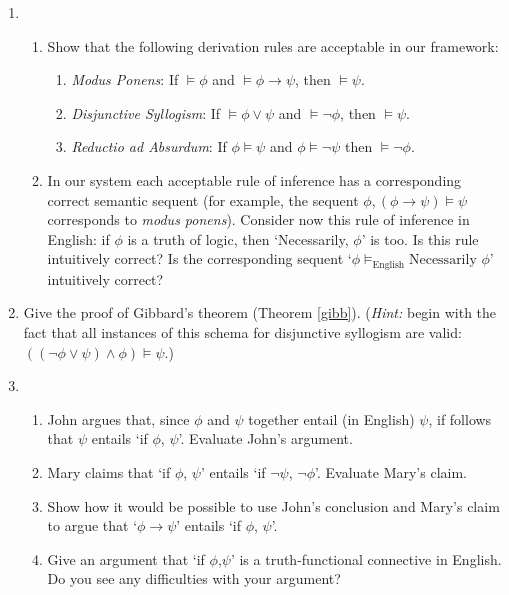 {\begin{enumerate}
	\item 	\begin{enumerate} \item Show that the following derivation rules are acceptable in our framework: \begin{enumerate}
		\item \emph{Modus Ponens}: If $\vDash \phi$ and $\vDash \phi \to \psi$, then $\vDash \psi$.
				\item \emph{Disjunctive Syllogism}: If $\vDash \phi \vee \psi$ and $\vDash \neg \phi$, then $\vDash \psi$.
				\item \emph{Reductio ad Absurdum}: If $\phi \vDash \psi$ and $\phi \vDash \neg \psi$ then $\vDash \neg \phi$. \end{enumerate}
	\item
		 In our system each acceptable rule of inference has a corresponding correct semantic sequent (for example, the sequent $\phi, (\phi \to \psi) \vDash \psi$ corresponds to  \emph{modus ponens}). Consider now this rule of inference in English: if $\phi$ is a truth of logic, then `Necessarily, $\phi$' is too.  Is this rule intuitively correct? Is the corresponding sequent `$\phi \vDash_{\text{English}} \text{Necessarily } \phi$' intuitively correct?
		\end{enumerate}
\item Give the proof of Gibbard's theorem (Theorem \ref{gibb}). (\emph{Hint:} begin with the fact that all instances of this schema for disjunctive syllogism are valid: $((¬\phi \vee \psi)\wedge\phi)\vDash\psi$.)
		\item \begin {enumerate} \item John argues that, since $\phi$ and $\psi$ together entail (in English)
		$\psi$, if follows that $\psi$ entails `if $\phi$, $\psi$'. Evaluate John's argument.

		\item Mary claims that `if $\phi$, $\psi$' entails `if $\neg \psi$, $\neg
		\phi$'. Evaluate Mary's claim.
		\item Show how it would be possible to use John's conclusion and
		Mary's claim to argue that `$\phi \to \psi$' entails `if $\phi$,
		$\psi$'.
		\item Give an argument that `if $\phi$,$\psi$' is a truth-functional connective in English. Do you see any difficulties with your argument?

		\end{enumerate}	



\end{enumerate}}
